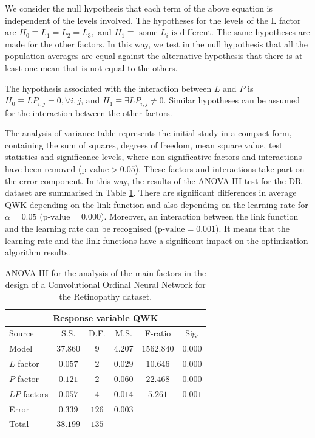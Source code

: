 \documentclass[journal]{IEEEtran}
\begin{document}
	We consider the null hypothesis that each term of the above equation is independent of the levels involved. The hypotheses for the levels of the L factor are $H_0 \equiv L_1 = L_2 = L_3,$ and $H_1 \equiv \text{ some } L_i \text{ is different}$. The same hypotheses are made for the other factors. In this way, we test in the null hypothesis that all the population averages are equal against the alternative hypothesis that there is at least one mean that is not equal to the others.
	
	The hypothesis associated with the interaction between $L$ and $P$ is $H_0 \equiv LP_{i,j} = 0, \forall i,j$, and $H_1 \equiv \exists LP_{i,j} \ne 0$. Similar hypotheses can be assumed for the interaction between the other factors.
	
	The analysis of variance table represents the initial study in a compact form, containing the sum of squares, degrees of freedom, mean square value, test statistics and significance levels, where non-significative factors and interactions have been removed ($\text{p-value} > 0.05$). These factors and interactions take part on the error component. In this way, the results of the ANOVA III test for the DR dataset are summarised in Table  \ref{table:ANOVARetinopathy}. There are significant differences in average QWK depending on the link function and also depending on the learning rate for $\alpha=0.05$ ($\text{p-value} = 0.000$). Moreover, an interaction between the link function and the learning rate can be recognised ($\text{p-value} = 0.001$). It means that the learning rate and the link functions have a significant impact on the optimization algorithm results.
		
	\begin{table}[!t]
		\caption{ANOVA III for the analysis of the main factors in the design of a Convolutional Ordinal Neural Network for the Retinopathy dataset.}
		\label{table:ANOVARetinopathy}
		\centering
		\small
		\begin{tabular}{lccccc}
			\hline
			\hline
			           \multicolumn{6}{c}{Response variable QWK}             \\ \hline
			Source       &   S.S.   & D.F.  &  M.S.   &  F-ratio   &  Sig.   \\ \hline
			Model        & $37.860$ &  $9$  & $4.207$ & $1562.840$ & $0.000$ \\
			$L$ factor   & $0.057$  &  $2$  & $0.029$ &  $10.646$  & $0.000$ \\
			$P$ factor   & $0.121$  &  $2$  & $0.060$ &  $22.468$  & $0.000$ \\
			$LP$ factors & $0.057$  &  $4$  & $0.014$ &  $5.261$   & $0.001$ \\
			Error        & $0.339$  & $126$ & $0.003$ &            &  \\ \hline
			Total        & $38.199$ & $135$ &         &            & \\
			\hline
			\hline
		\end{tabular}
	\end{table}
	
\end{document}
